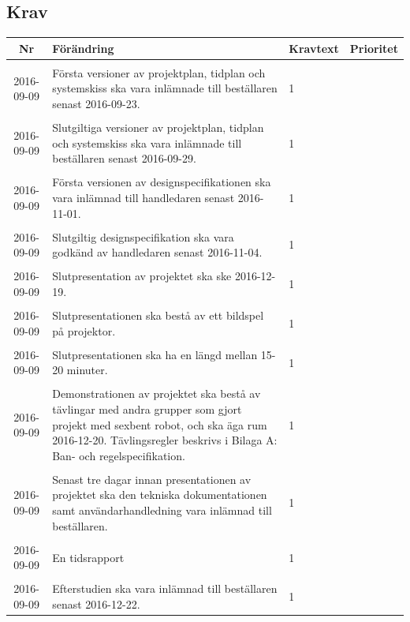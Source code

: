 \documentclass[a4paper,titlepage,12pt]{article}
\newcounter{reqNr}
\newcounter{reqNrII}
\newcommand{\nextReqNrII}{\stepcounter{reqNrII}\arabic{reqNrII}}
\newcommand{\newRequirement}[1] {\pbox{5cm}{Tillagt \\#1}}
\begin{document}
	\subsection{Krav}
	\begin{longtable}[c]{ c l>{\raggedright}p{} l }
		\hline
		\textbf{Nr} & \textbf{Förändring} & \textbf{Kravtext} & \textbf{Prioritet} 
			\\ \hline

		\nextReqNrII & \newRequirement{2016-09-09} & Första versioner av
        projektplan, tidplan och systemskiss ska vara inlämnade till
        beställaren senast 2016-09-23. & 1
			\\ \midrule

		\nextReqNrII & \newRequirement{2016-09-09} & Slutgiltiga versioner av
        projektplan, tidplan och systemskiss ska vara inlämnade till
        beställaren senast 2016-09-29. & 1
			\\ \midrule

		\nextReqNrII & \newRequirement{2016-09-09} & Första versionen av
			designspecifikationen ska vara inlämnad till handledaren senast
			2016-11-01. & 1
			\\ \hline

		\nextReqNrII & \newRequirement{2016-09-09} & Slutgiltig designspecifikation
			ska vara godkänd av handledaren senast 2016-11-04. & 1
			\\ \hline
			
		\nextReqNrII & \newRequirement{2016-09-09} & Slutpresentation av projektet ska
		ske 2016-12-19. & 1
			\\ \hline

		\nextReqNrII & \newRequirement{2016-09-09} & Slutpresentationen ska bestå av
		ett bildspel på projektor. & 1
			\\ \hline

		\nextReqNrII & \newRequirement{2016-09-09} & Slutpresentationen ska ha en
		längd mellan 15-20 minuter. & 1
			\\ \hline

		\nextReqNrII & \newRequirement{2016-09-09} & Demonstrationen av projektet ska
		bestå av tävlingar med andra grupper som gjort projekt med sexbent
		robot, och ska äga rum 2016-12-20. Tävlingsregler beskrivs i Bilaga
		A: Ban- och regelspecifikation. & 1
			\\ \hline

		\nextReqNrII & \newRequirement{2016-09-09} & Senast tre dagar innan
			presentationen av projektet ska den tekniska dokumentationen
			samt användarhandledning vara inlämnad till beställaren. & 1
			\\ \hline

		\nextReqNrII & \newRequirement{2016-09-09} & En tidsrapport & 1
			\\ \hline

		\nextReqNrII & \newRequirement{2016-09-09} & Efterstudien ska vara inlämnad
		till beställaren senast 2016-12-22. & 1
			\\ 

	\end{longtable}
	
\end{document}
